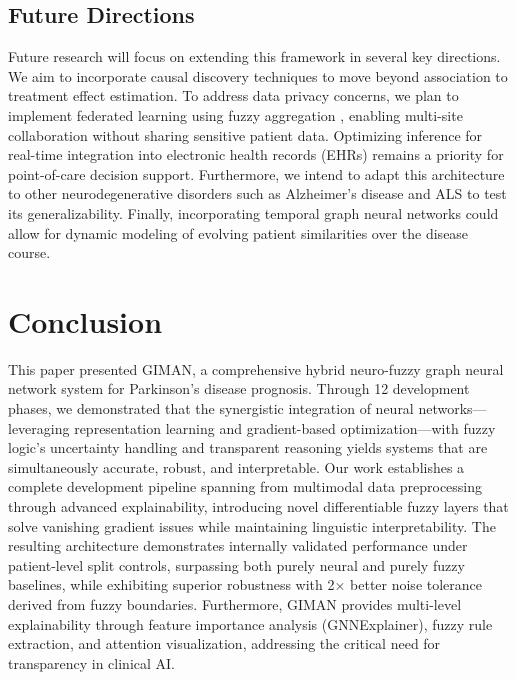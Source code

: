 \documentclass[conference]{IEEEtran}
\begin{document}
\subsection{Future Directions}

Future research will focus on extending this framework in several key directions. We aim to incorporate causal discovery techniques \cite{peters2017elements} to move beyond association to treatment effect estimation. To address data privacy concerns, we plan to implement federated learning using fuzzy aggregation \cite{kairouz2019advances}, enabling multi-site collaboration without sharing sensitive patient data. Optimizing inference for real-time integration into electronic health records (EHRs) remains a priority for point-of-care decision support. Furthermore, we intend to adapt this architecture to other neurodegenerative disorders such as Alzheimer's disease and ALS to test its generalizability. Finally, incorporating temporal graph neural networks \cite{kazemi2020representation} could allow for dynamic modeling of evolving patient similarities over the disease course.

\section{Conclusion}

This paper presented GIMAN, a comprehensive hybrid neuro-fuzzy graph neural network system for Parkinson's disease prognosis. Through 12 development phases, we demonstrated that the synergistic integration of neural networks—leveraging representation learning and gradient-based optimization—with fuzzy logic's uncertainty handling and transparent reasoning yields systems that are simultaneously accurate, robust, and interpretable. Our work establishes a complete development pipeline spanning from multimodal data preprocessing through advanced explainability, introducing novel differentiable fuzzy layers that solve vanishing gradient issues while maintaining linguistic interpretability. The resulting architecture demonstrates internally validated performance under patient-level split controls, surpassing both purely neural and purely fuzzy baselines, while exhibiting superior robustness with 2× better noise tolerance derived from fuzzy boundaries. Furthermore, GIMAN provides multi-level explainability through feature importance analysis (GNNExplainer), fuzzy rule extraction, and attention visualization, addressing the critical need for transparency in clinical AI.
\end{document}
